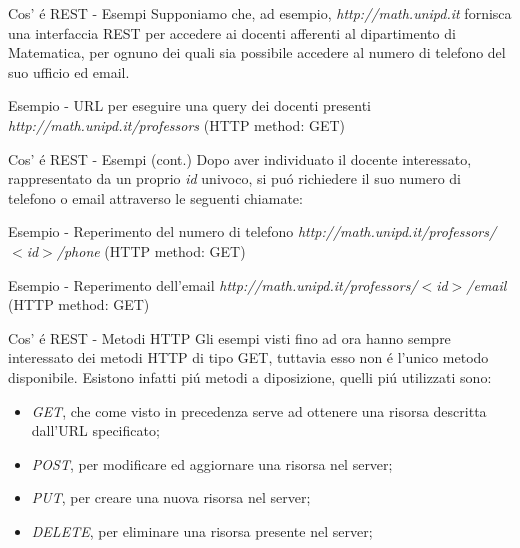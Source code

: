 \documentclass{beamer}
\begin{document}
\begin{frame}{Cos'	\'e REST - Esempi}
Supponiamo che, ad esempio, \emph{http://math.unipd.it} fornisca una interfaccia REST per accedere ai docenti afferenti
al dipartimento di Matematica, per ognuno dei quali sia possibile accedere al numero di telefono del suo ufficio ed email.

\begin{exampleblock}{Esempio - URL per eseguire una query dei docenti presenti}
 \emph{http://math.unipd.it/professors} (HTTP method: GET)
\end{exampleblock}

\end{frame}


\begin{frame}{Cos'	\'e REST - Esempi (cont.)}
Dopo aver individuato il docente interessato, rappresentato da un proprio \emph{id} univoco, si pu\'o richiedere il suo
numero di telefono o email attraverso le seguenti chiamate:

\begin{exampleblock}{Esempio - Reperimento del numero di telefono}
 \emph{http://math.unipd.it/professors/$<$id$>$/phone} (HTTP method: GET)
\end{exampleblock}

\begin{exampleblock}{Esempio - Reperimento dell'email}
 \emph{http://math.unipd.it/professors/$<$id$>$/email} (HTTP method: GET)
\end{exampleblock}
\end{frame}


\begin{frame}{Cos'	\'e REST - Metodi HTTP}
Gli esempi visti fino ad ora hanno sempre interessato dei metodi HTTP di tipo GET, tuttavia esso non \'e l'unico metodo disponibile.
Esistono infatti pi\'u metodi a diposizione, quelli pi\'u utilizzati sono:
\begin{itemize}
\item \emph{GET}, che come visto in precedenza serve ad ottenere una risorsa descritta dall'URL specificato;
\item \emph{POST}, per modificare ed aggiornare una risorsa nel server;
\item \emph{PUT}, per creare una nuova risorsa nel server;
\item \emph{DELETE}, per eliminare una risorsa presente nel server;
\end{itemize}
\end{frame}
\end{document}
